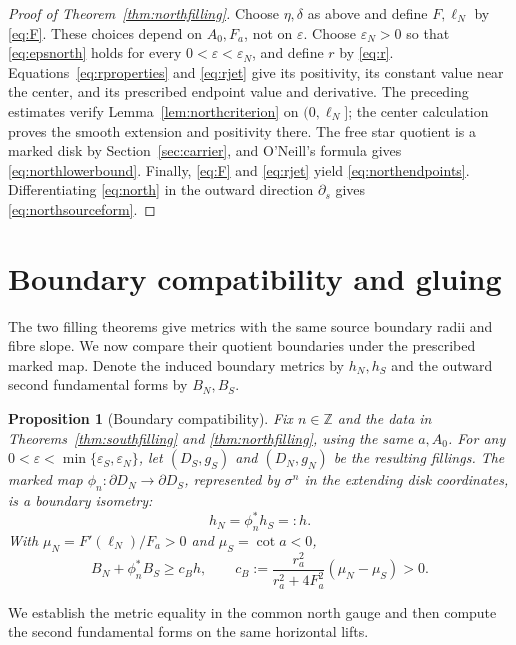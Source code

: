 \documentclass[12pt]{amsart}
\numberwithin{equation}{section}
\newtheorem{proposition}[theorem]{Proposition}
\theoremstyle{remark}
\newcommand{\eps}{\varepsilon}
\begin{document}
\begin{proof}[Proof of Theorem~\ref{thm:northfilling}]
Choose \(\eta,\delta\) as above and define \(F,\ell_N\) by
\eqref{eq:F}. These choices depend on \(A_0,F_a\), not on
\(\eps\). Choose \(\eps_N>0\) so that \eqref{eq:epsnorth}
holds for every \(0<\eps<\eps_N\), and define \(r\) by
\eqref{eq:r}. Equations~\eqref{eq:rproperties} and
\eqref{eq:rjet} give its positivity, its constant value near the
center, and its prescribed endpoint value and derivative.
The preceding estimates verify Lemma~\ref{lem:northcriterion} on
\((0,\ell_N]\); the center calculation proves the smooth extension
and positivity there. The free star quotient is a marked disk by
Section~\ref{sec:carrier}, and O'Neill's formula gives
\eqref{eq:northlowerbound}. Finally, \eqref{eq:F} and
\eqref{eq:rjet} yield \eqref{eq:northendpoints}. Differentiating
\eqref{eq:north} in the outward direction \(\partial_s\) gives
\eqref{eq:northsourceform}.
\end{proof}

\section{Boundary compatibility and gluing}\label{sec:gluing}

The two filling theorems give metrics with the same source boundary
radii and fibre slope. We now compare their quotient boundaries under
the prescribed marked map. Denote the induced boundary metrics by
\(h_N,h_S\) and the outward second fundamental forms by \(B_N,B_S\).

\begin{proposition}[Boundary compatibility]\label{prop:boundarycompatibility}
Fix \(n\in\mathbb Z\) and the data in
Theorems~\ref{thm:southfilling} and \ref{thm:northfilling}, using
the same \(a,A_0\). For any
\(0<\eps<\min\{\eps_S,\eps_N\}\), let \((D_S,g_S)\) and
\((D_N,g_N)\) be the resulting fillings. The marked map
\(\phi_n:\partial D_N\to\partial D_S\), represented by
\(\sigma^n\) in the extending disk coordinates, is a boundary
isometry:
\[
 h_N=\phi_n^*h_S=:h.
\]
With \(\mu_N=F'(\ell_N)/F_a>0\) and \(\mu_S=\cot a<0\),
\begin{equation}\label{eq:boundarymargin}
 B_N+\phi_n^*B_S\ge c_B h,
 \qquad c_B:=\frac{r_a^2}{r_a^2+4F_a^2}(\mu_N-\mu_S)>0.
\end{equation}
\end{proposition}

We establish the metric equality in the common north gauge and then
compute the second fundamental forms on the same horizontal lifts.
\end{document}
